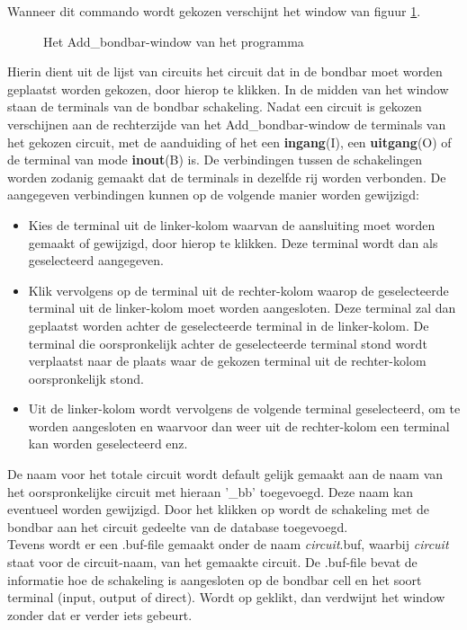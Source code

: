 Wanneer dit commando wordt gekozen verschijnt het window van
figuur \ref{bondbar-window}.
\begin{figure}[htb]
\centerline{}
\caption{Het Add\_bondbar-window van het programma }
\label{bondbar-window}
\end{figure}
Hierin dient uit de lijst van circuits het circuit dat in de bondbar moet
worden geplaatst worden gekozen, door hierop te klikken.
In de midden van het window staan de terminals van de bondbar schakeling.
Nadat een circuit is gekozen verschijnen aan de rechterzijde van het
Add\_bondbar-window de terminals van het gekozen circuit, met de aanduiding
of het een {\bf ingang}(I), een {\bf uitgang}(O) of de terminal van mode {\bf inout}(B) is.
De verbindingen tussen de schakelingen worden
                   zodanig gemaakt dat de terminals in dezelfde rij worden
                   verbonden. De aangegeven verbindingen kunnen op de volgende
                   manier worden gewijzigd:
                   \begin{itemize}
                   \item Kies de terminal uit de linker-kolom waarvan de
                         aansluiting moet worden gemaakt of gewij\-zigd, door
                         hierop te klikken. Deze terminal wordt dan als
                         geselecteerd aangegeven.
                   \item Klik vervolgens op de terminal uit de rechter-kolom
                         waarop de geselecteerde terminal uit de linker-kolom
                         moet worden aangesloten. Deze terminal zal dan
                         geplaatst worden achter de ge\-se\-lecteerde terminal
                         in de linker-kolom. De terminal die oorspronkelijk
                         achter de geselecteerde terminal stond wordt verplaatst
                         naar de plaats waar de gekozen terminal uit de
                         rechter-kolom oorspronkelijk stond.
                   \item Uit de linker-kolom wordt vervolgens de volgende
                         terminal geselecteerd, om te worden aange\-sloten en
                         waarvoor dan weer uit de rechter-kolom een
                         terminal kan worden geselecteerd enz.
                   \end{itemize}
De naam voor het totale circuit wordt default gelijk gemaakt aan de naam van
het oorspronke\-lij\-ke circuit met hieraan '\_bb' toegevoegd.
Deze naam kan eventueel worden gewijzigd.
Door het klikken op  wordt de schakeling met de bondbar aan het circuit
gedeelte van de  database toegevoegd.\\
Tevens wordt er een .buf-file gemaakt onder de naam
{\it circuit}.buf, waarbij {\it circuit} staat voor de circuit-naam,
van het gemaakte circuit.
De .buf-file bevat de informatie hoe de schakeling is aangesloten op de
bondbar cell en het soort terminal (input, output of direct).
Wordt op  geklikt, dan verdwijnt het
window zonder dat er verder iets gebeurt.

